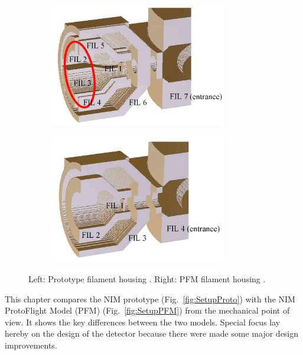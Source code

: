 	\begin{figure}[h!] %
		\begin{subfigure}{0.5\textwidth}
			\centering
			\includegraphics[width =0.85\textwidth]{Setup/Proto_FilEl_sim.jpg}
		\end{subfigure}
		\begin{subfigure}{0.5\textwidth}
			\centering
			\includegraphics[width = 0.85\textwidth]{Setup/PFM_FilEl_sim.jpg}
		\end{subfigure}
		\caption{Left: Prototype filament housing \cite{Diss_Meyer}. Right: PFM filament housing \cite{Diss_Meyer}.}
		\label{fig:SetupFilElSim}
	\end{figure}
	This chapter compares the NIM prototype (Fig.~\ref{fig:SetupProto}) with the NIM ProtoFlight Model (PFM) (Fig.~\ref{fig:SetupPFM}) from the mechanical point of view. It shows the key differences between the two models. Special focus lay hereby on the design of the detector because there were made some major design improvements.\\
